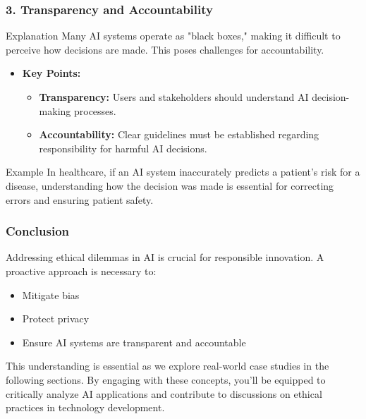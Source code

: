 \documentclass[aspectratio=169]{beamer}
\begin{document}
\begin{frame}[fragile]
    \frametitle{3. Transparency and Accountability}
    
    \begin{block}{Explanation}
        Many AI systems operate as "black boxes," making it difficult to perceive how decisions are made. 
        This poses challenges for accountability.
    \end{block}

    \begin{itemize}
        \item \textbf{Key Points:}
            \begin{itemize}
                \item \textbf{Transparency:} Users and stakeholders should understand AI decision-making processes.
                \item \textbf{Accountability:} Clear guidelines must be established regarding responsibility for harmful AI decisions.
            \end{itemize}
    \end{itemize}

    \begin{exampleblock}{Example}
        In healthcare, if an AI system inaccurately predicts a patient's risk for a disease, 
        understanding how the decision was made is essential for correcting errors and ensuring patient safety.
    \end{exampleblock}
\end{frame}

\begin{frame}[fragile]
    \frametitle{Conclusion}
    
    Addressing ethical dilemmas in AI is crucial for responsible innovation. A proactive approach is necessary to:
    \begin{itemize}
        \item Mitigate bias
        \item Protect privacy
        \item Ensure AI systems are transparent and accountable
    \end{itemize}

    This understanding is essential as we explore real-world case studies in the following sections. By engaging with these concepts, you’ll be equipped to critically analyze AI applications and contribute to discussions on ethical practices in technology development.
\end{frame}
\end{document}
